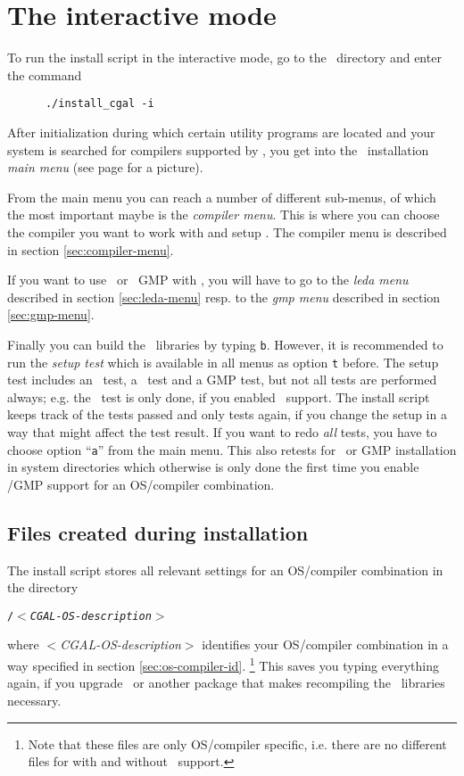 \section{The interactive mode}\label{sec:interactive-mode}

To run the install script in the interactive mode, go to the \cgaldir\ 
directory and enter the command
\begin{verbatim}
      ./install_cgal -i
\end{verbatim}

After initialization during which certain utility programs are located
and your system is searched for compilers supported by \cgal, you get
into the \cgal\ installation \textit{main menu} (see page
\pageref{pic:main-menu} for a picture).

From the main menu you can reach a number of different sub-menus, of
which the most important maybe is the \textit{compiler menu}. This is
where you can choose the compiler you want to work with and setup
\stl.  The compiler menu is described in section
\ref{sec:compiler-menu}.

If you want to use \leda\ or \gnu\ GMP with \cgal, you will have to go
to the \textit{leda menu} described in section \ref{sec:leda-menu} resp.
to the \textit{gmp menu} described in section \ref{sec:gmp-menu}.

Finally you can build the \cgal\ libraries by typing \texttt{b}.
However, it is recommended to run the \textit{setup test} which is
available in all menus as option \texttt{t} before. The setup test
includes an \stl\ test, a \leda\ test and a GMP test, but not all
tests are performed always; e.g. the \leda\ test is only done, if you
enabled \leda\ support. The install script keeps track of the tests
passed and only tests again, if you change the setup in a way that
might affect the test result. If you want to redo \textit{all} tests,
you have to choose option ``\texttt{a}'' from the main menu. This also
retests for \leda\ or GMP installation in system directories which
otherwise is only done the first time you enable \leda/GMP support for
an OS/compiler combination.

\subsection{Files created during installation}

The install script stores all relevant settings for an OS/compiler
combination in the directory 
\begin{center}
  \texttt{\cgalinstconfdir/$<$\textit{CGAL-OS-description}$>$}
\end{center}
where $<$\textit{CGAL-OS-description}$>$ identifies your OS/compiler
combination in a way specified in section \ref{sec:os-compiler-id}.
\footnote{Note that these files are only OS/compiler specific, i.e.
  there are no different files for with and without \leda\ support.}
This saves you typing everything again, if you upgrade \cgal\ or
another package that makes recompiling the \cgal\ libraries necessary.

